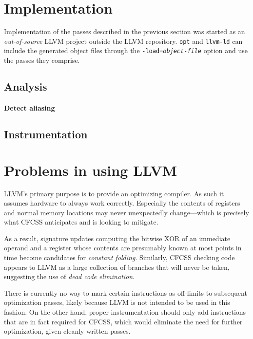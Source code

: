 \section{Implementation}

Implementation of the passes described in the previous section was started as
an \emph{out-of-source} LLVM project outside the LLVM repository. \texttt{opt}
and \texttt{llvm-ld} can include the generated object files through the
\texttt{-load=\textit{object-file}} option and use the passes they comprise.

\subsection{Analysis}

\paragraph{Detect aliasing}

\subsection{Instrumentation}

\section{Problems in using LLVM}

LLVM's primary purpose is to provide an optimizing compiler. As such it assumes
hardware to always work correctly. Especially the contents of registers and
normal memory locations may never unexpectedly change—which is precisely what
CFCSS anticipates and is looking to mitigate.

As a result, signature updates computing the bitwise XOR of an immediate
operand and a register whose contents are presumably known at most points in
time become candidates for \emph{constant folding}. Similarly, CFCSS checking
code appears to LLVM as a large collection of branches that will never be
taken, suggesting the use of \emph{dead code elimination}.

There is currently no way to mark certain instructions as off-limits to
subsequent optimization passes, likely because LLVM is not intended to be used
in this fashion. On the other hand, proper instrumentation should only add
instructions that are in fact required for CFCSS, which would eliminate the
need for further optimization, given cleanly written passes.



